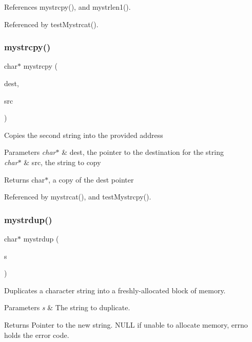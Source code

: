 References mystrcpy(), and mystrlen1().



Referenced by test\+Mystrcat().

\mbox{\label{mystring_8c_acce8ca34ad672c764b2817e5f91707d6}} 
\subsubsection{mystrcpy()}
{\footnotesize\ttfamily char$\ast$ mystrcpy (\begin{DoxyParamCaption}\item[{char $\ast$}]{dest,  }\item[{char $\ast$}]{src }\end{DoxyParamCaption})}

Copies the second string into the provided address 
\begin{DoxyParams}{Parameters}
{\em char$\ast$} & dest, the pointer to the destination for the string \\
\hline
{\em char$\ast$} & src, the string to copy \\
\hline
\end{DoxyParams}
\begin{DoxyReturn}{Returns}
char$\ast$, a copy of the dest pointer 
\end{DoxyReturn}


Referenced by mystrcat(), and test\+Mystrcpy().

\mbox{\label{mystring_8c_afd0ffd16b17423165bbba7ccadac9375}} 
\subsubsection{mystrdup()}
{\footnotesize\ttfamily char$\ast$ mystrdup (\begin{DoxyParamCaption}\item[{char $\ast$}]{s }\end{DoxyParamCaption})}

Duplicates a character string into a freshly-\/allocated block of memory. 
\begin{DoxyParams}{Parameters}
{\em s} & The string to duplicate. \\
\hline
\end{DoxyParams}
\begin{DoxyReturn}{Returns}
Pointer to the new string. N\+U\+LL if unable to allocate memory, errno holds the error code. 
\end{DoxyReturn}



